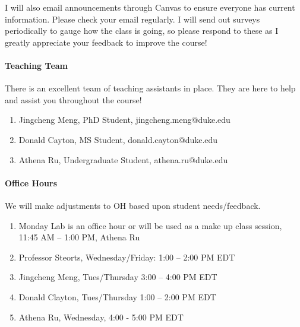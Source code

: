 \documentclass[11pt]{article}
\begin{document}
I will also email announcements through Canvas to ensure everyone has current information. Please check your email regularly. I will send out surveys periodically to gauge how the class is going, so please respond to these as I greatly appreciate your feedback to improve the course! 

\paragraph{Teaching Team}
There is an excellent team of teaching assistants in place. They are here to help and assist you throughout the course! 

\begin{enumerate}
\item Jingcheng Meng, PhD Student, jingcheng.meng@duke.edu
\item  Donald Cayton, MS Student, donald.cayton@duke.edu
\item  Athena Ru, Undergraduate Student, athena.ru@duke.edu
\end{enumerate}


\paragraph{Office Hours}
We will make adjustments to OH based upon student needs/feedback. 
\begin{enumerate}
\item Monday Lab is an office hour or will be used as a make up class session, \\ 11:45 AM -- 1:00 PM, Athena Ru\\
\item Professor Steorts, Wednesday/Friday: 1:00 -- 2:00 PM EDT\\
\item  Jingcheng Meng, Tues/Thursday 3:00 -- 4:00 PM EDT \\
\item Donald Clayton, Tues/Thursday 1:00 -- 2:00 PM EDT \\
\item Athena Ru, Wednesday, 4:00 - 5:00 PM EDT \\
\end{enumerate}
\end{document}
